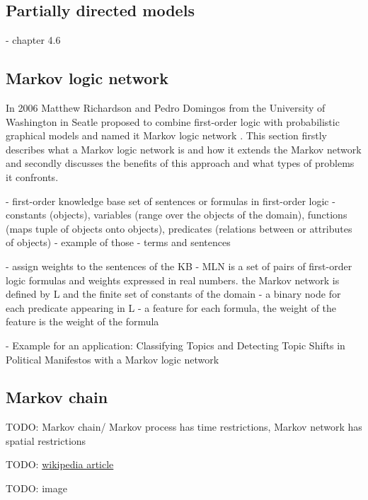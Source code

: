 
\subsection{Partially directed models}

- chapter 4.6


\subsection{Markov logic network} \label{sec:mln}

In 2006 Matthew Richardson and Pedro Domingos from the University of Washington in Seatle proposed to combine first-order logic with probabilistic graphical models and named it Markov logic network \cite{richardson2006markov}. This section firstly describes what a Markov logic network is and how it extends the Markov network and secondly discusses the benefits of this approach and what types of problems it confronts.

- first-order knowledge base set of sentences or formulas in first-order logic
- constants (objects), variables (range over the objects of the domain), functions (maps tuple of objects onto objects), predicates (relations between or attributes of objects)
- example of those
- terms and sentences

- assign weights to the sentences of the KB
- MLN is a set of pairs of first-order logic formulas and weights expressed in real numbers. the Markov network is defined by L and the finite set of constants of the domain 
 - a binary node for each predicate appearing in L
 - a feature for each formula, the weight of the feature is the weight of the formula

- Example for an application: Classifying Topics and Detecting Topic Shifts in Political Manifestos with a Markov logic network \cite{zirn2016classifying}


\subsection{Markov chain}

TODO: Markov chain/ Markov process has time restrictions, Markov network has spatial restrictions

TODO: \href{https://en.wikipedia.org/wiki/Markov_chain}{wikipedia article}

TODO: image



